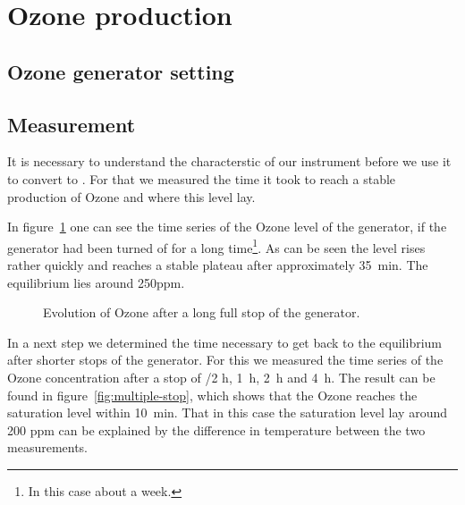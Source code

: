 \section{Ozone production}
\label{sec:ozone}

\subsection{Ozone generator setting}
\label{sec:ozone-setting}



\subsection{Measurement}
\label{sec:ozone-meas}

It is necessary to understand the characterstic of our instrument
before we use it to convert  to . For that we measured
the time it took to reach a stable production of Ozone and where this
level lay. 

In figure~\ref{fig:long-stop} one can see the time series of the Ozone
level of the generator, if the generator had been turned of for a long
time\footnote{In this case about a week.}. As can be seen the level
rises rather quickly and reaches a stable plateau after approximately
\SI{35}{\minute}. The equilibrium lies around 250ppm.

\begin{figure}[htbp]
  \centering
  \caption{Evolution of Ozone after a long full stop of the
    generator.}
  \label{fig:long-stop}
\end{figure}

In a next step we determined the time necessary to get back to the
equilibrium after shorter stops of the generator. For this we measured
the time series of the Ozone concentration after a stop of {/2} \si{\hour}, \SI{1}{\hour}, \SI{2}{\hour} and \SI{4}{\hour}. The
result can be found in figure~\ref{fig:multiple-stop}, which shows
that the Ozone reaches the saturation level within
\SI{10}{\minute}. That in this case the saturation level lay around
200 ppm can be explained by the difference in temperature between the
two measurements. 

